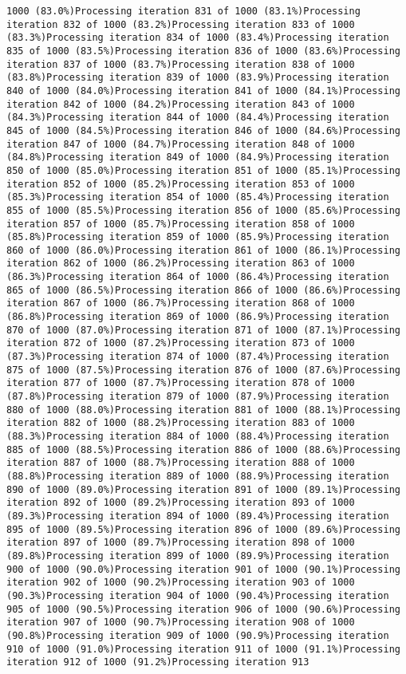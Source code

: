 \documentclass[
]{article}
\begin{document}
\begin{verbatim}
1000 (83.0%)Processing iteration 831 of 1000 (83.1%)Processing iteration 832 of 1000 (83.2%)Processing iteration 833 of 1000 (83.3%)Processing iteration 834 of 1000 (83.4%)Processing iteration 835 of 1000 (83.5%)Processing iteration 836 of 1000 (83.6%)Processing iteration 837 of 1000 (83.7%)Processing iteration 838 of 1000 (83.8%)Processing iteration 839 of 1000 (83.9%)Processing iteration 840 of 1000 (84.0%)Processing iteration 841 of 1000 (84.1%)Processing iteration 842 of 1000 (84.2%)Processing iteration 843 of 1000 (84.3%)Processing iteration 844 of 1000 (84.4%)Processing iteration 845 of 1000 (84.5%)Processing iteration 846 of 1000 (84.6%)Processing iteration 847 of 1000 (84.7%)Processing iteration 848 of 1000 (84.8%)Processing iteration 849 of 1000 (84.9%)Processing iteration 850 of 1000 (85.0%)Processing iteration 851 of 1000 (85.1%)Processing iteration 852 of 1000 (85.2%)Processing iteration 853 of 1000 (85.3%)Processing iteration 854 of 1000 (85.4%)Processing iteration 855 of 1000 (85.5%)Processing iteration 856 of 1000 (85.6%)Processing iteration 857 of 1000 (85.7%)Processing iteration 858 of 1000 (85.8%)Processing iteration 859 of 1000 (85.9%)Processing iteration 860 of 1000 (86.0%)Processing iteration 861 of 1000 (86.1%)Processing iteration 862 of 1000 (86.2%)Processing iteration 863 of 1000 (86.3%)Processing iteration 864 of 1000 (86.4%)Processing iteration 865 of 1000 (86.5%)Processing iteration 866 of 1000 (86.6%)Processing iteration 867 of 1000 (86.7%)Processing iteration 868 of 1000 (86.8%)Processing iteration 869 of 1000 (86.9%)Processing iteration 870 of 1000 (87.0%)Processing iteration 871 of 1000 (87.1%)Processing iteration 872 of 1000 (87.2%)Processing iteration 873 of 1000 (87.3%)Processing iteration 874 of 1000 (87.4%)Processing iteration 875 of 1000 (87.5%)Processing iteration 876 of 1000 (87.6%)Processing iteration 877 of 1000 (87.7%)Processing iteration 878 of 1000 (87.8%)Processing iteration 879 of 1000 (87.9%)Processing iteration 880 of 1000 (88.0%)Processing iteration 881 of 1000 (88.1%)Processing iteration 882 of 1000 (88.2%)Processing iteration 883 of 1000 (88.3%)Processing iteration 884 of 1000 (88.4%)Processing iteration 885 of 1000 (88.5%)Processing iteration 886 of 1000 (88.6%)Processing iteration 887 of 1000 (88.7%)Processing iteration 888 of 1000 (88.8%)Processing iteration 889 of 1000 (88.9%)Processing iteration 890 of 1000 (89.0%)Processing iteration 891 of 1000 (89.1%)Processing iteration 892 of 1000 (89.2%)Processing iteration 893 of 1000 (89.3%)Processing iteration 894 of 1000 (89.4%)Processing iteration 895 of 1000 (89.5%)Processing iteration 896 of 1000 (89.6%)Processing iteration 897 of 1000 (89.7%)Processing iteration 898 of 1000 (89.8%)Processing iteration 899 of 1000 (89.9%)Processing iteration 900 of 1000 (90.0%)Processing iteration 901 of 1000 (90.1%)Processing iteration 902 of 1000 (90.2%)Processing iteration 903 of 1000 (90.3%)Processing iteration 904 of 1000 (90.4%)Processing iteration 905 of 1000 (90.5%)Processing iteration 906 of 1000 (90.6%)Processing iteration 907 of 1000 (90.7%)Processing iteration 908 of 1000 (90.8%)Processing iteration 909 of 1000 (90.9%)Processing iteration 910 of 1000 (91.0%)Processing iteration 911 of 1000 (91.1%)Processing iteration 912 of 1000 (91.2%)Processing iteration 913 
\end{verbatim}
\end{document}
